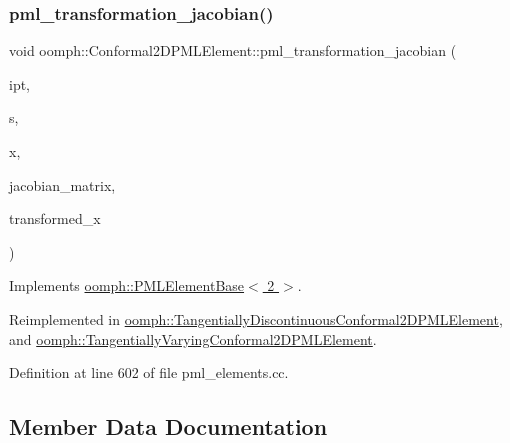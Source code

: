 \subsubsection{\texorpdfstring{pml\+\_\+transformation\+\_\+jacobian()}{pml\_transformation\_jacobian()}\hspace{0.1cm}{\footnotesize\ttfamily [2/2]}}
{\footnotesize\ttfamily void oomph\+::\+Conformal2\+D\+P\+M\+L\+Element\+::pml\+\_\+transformation\+\_\+jacobian (\begin{DoxyParamCaption}\item[{const unsigned \&}]{ipt,  }\item[{const \hyperlink{classoomph_1_1Vector}{Vector}$<$ double $>$ \&}]{s,  }\item[{const \hyperlink{classoomph_1_1Vector}{Vector}$<$ double $>$ \&}]{x,  }\item[{\hyperlink{classoomph_1_1DenseComplexMatrix}{Dense\+Complex\+Matrix} \&}]{jacobian\+\_\+matrix,  }\item[{\hyperlink{classoomph_1_1Vector}{Vector}$<$ std\+::complex$<$ double $>$ $>$ \&}]{transformed\+\_\+x }\end{DoxyParamCaption})\hspace{0.3cm}{\ttfamily [virtual]}}



Implements \hyperlink{classoomph_1_1PMLElementBase_a4b9d6d74aa15e6395590b27686477b20}{oomph\+::\+P\+M\+L\+Element\+Base$<$ 2 $>$}.



Reimplemented in \hyperlink{classoomph_1_1TangentiallyDiscontinuousConformal2DPMLElement_a2436ebd949ec246a11a7b617a890443e}{oomph\+::\+Tangentially\+Discontinuous\+Conformal2\+D\+P\+M\+L\+Element}, and \hyperlink{classoomph_1_1TangentiallyVaryingConformal2DPMLElement_a56a6af4af3774579d49d9dcc8c7e9bea}{oomph\+::\+Tangentially\+Varying\+Conformal2\+D\+P\+M\+L\+Element}.



Definition at line 602 of file pml\+\_\+elements.\+cc.



\subsection{Member Data Documentation}
\mbox{\label{classoomph_1_1Conformal2DPMLElement_a465f23e8087bb37ff3f61f25c2722735}} 
